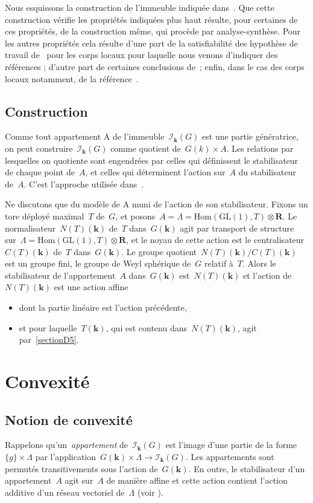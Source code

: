 \documentclass[french]{amsart}
\newcommand{\kk}{\mathbf{k}}
\newcommand{\Ik}{\mathscr{I}_\kk}
\newcommand{\GL}{\mathrm{GL}}
\newcommand{\R}{\mathbf{R}}
\newcommand{\Hom}{\mathrm{Hom}}
\newcommand{\tens}{\mathop{\otimes}}
\begin{document}
Nous esquissons la construction de l'immeuble indiquée dans~\cite{RTW09}. Que
cette construction vérifie les propriétés indiquées plus haut résulte, pour certaines
de ces propriétés, de la construction même, qui procède par analyse-synthèse.
Pour les autres propriétés cela résulte d'une part de la satisfiabilité des hypothèse
de travail de~\cite{BT72} pour les corps locaux pour laquelle nous venons d'indiquer
des références ; d'autre part de certaines conclusions de~\cite{BT72}; enfin, dans le cas
des corps locaux notamment, de la référence~\cite{Tit79}.


\subsection{Construction}\label{sectionE4} Comme tout appartement A de l'immeuble~$\Ik(G)$ est une partie génératrice, on peut construire~$\Ik(G)$ comme quotient de~$G(k) \times A$. Les relations par lesquelles on quotiente sont engendrées par celles qui définissent le stabilisateur de chaque point de~$A$, et celles qui déterminent l'action sur~$A$ du stabilisateur
de~$A$. C'est l'approche utilisée dans~\cite[1.3]{RTW09}.

Ne discutons que du modèle de A muni de l'action de son stabilisateur.
Fixons un tore déployé maximal~$T$ de~$G$, et posons~$A = \Lambda = \Hom(\GL(1),T ) \tens \R$.
Le normalisateur~$N(T )(\kk)$ de~$T$ dans~$G(\kk)$ agit par transport de structure sur~$\Lambda = \Hom(\GL(1),T )\tens\R$, et le noyau de cette action est le centralisateur~$C(T )(\kk)$
de~$T$ dans~$G(\kk)$. Le groupe quotient~$N(T )(\kk)/C(T )(\kk)$ est un groupe fini, le groupe de Weyl sphérique de~$G$ relatif à~$T$. Alors le stabilisateur de l'appartement~$A$ dans~$G(\kk)$
est~$N(T )(\kk)$ et l'action de~$N(T )(\kk)$ est une action affine
\begin{itemize}
\item dont la partie linéaire est l'action précédente, 
\item et pour laquelle~$T (\kk)$, qui est contenu dans~$N(T )(\kk)$, agit par~\ref{sectionD5}.
\end{itemize}
\section{{Convexit\'{e}}}\label{sectionF}
\subsection{{Notion de convexit\'{e}}}
Rappelons qu'un~\emph{appartement} de~$\Ik(G)$ est l'image d'une partie de la forme~$\{g\}\times\Lambda$ par l'application~$G(\kk)\times\Lambda\rightarrow \Ik(G)$. Les appartements sont permutés transitivements sous l'action de~$G(\kk)$. En outre, le stabilisateur d'un appartement~$A$ agit sur~$A$ de manière affine et cette action contient l'action additive d'un réseau vectoriel de~$\Lambda$ (voir \cite[1.2, 1.3]{Tit79}).
\end{document}
